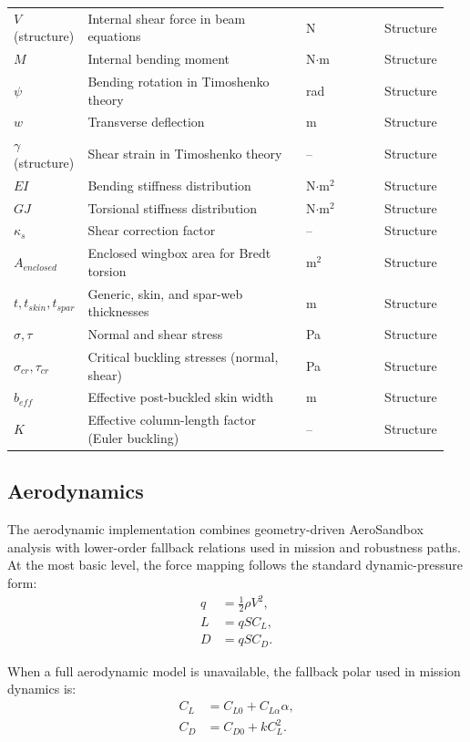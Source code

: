 \begin{longtable}{p{0.15\linewidth} p{0.50\linewidth} p{0.18\linewidth} p{0.12\linewidth}}
\(V\) (structure) & Internal shear force in beam equations & N & Structure \\
\(M\) & Internal bending moment & N\(\cdot\)m & Structure \\
\(\psi\) & Bending rotation in Timoshenko theory & rad & Structure \\
\(w\) & Transverse deflection & m & Structure \\
\(\gamma\) (structure) & Shear strain in Timoshenko theory & -- & Structure \\
\(EI\) & Bending stiffness distribution & N\(\cdot\)m\(^2\) & Structure \\
\(GJ\) & Torsional stiffness distribution & N\(\cdot\)m\(^2\) & Structure \\
\(\kappa_s\) & Shear correction factor & -- & Structure \\
\(A_{enclosed}\) & Enclosed wingbox area for Bredt torsion & m\(^2\) & Structure \\
\(t, t_{skin}, t_{spar}\) & Generic, skin, and spar-web thicknesses & m & Structure \\
\(\sigma, \tau\) & Normal and shear stress & Pa & Structure \\
\(\sigma_{cr}, \tau_{cr}\) & Critical buckling stresses (normal, shear) & Pa & Structure \\
\(b_{eff}\) & Effective post-buckled skin width & m & Structure \\
\(K\) & Effective column-length factor (Euler buckling) & -- & Structure \\
\bottomrule
\end{longtable}

\subsection{Aerodynamics}
The aerodynamic implementation combines geometry-driven AeroSandbox analysis with lower-order fallback relations used in mission and robustness paths. At the most basic level, the force mapping follows the standard dynamic-pressure form:
\begin{align}
q &= \tfrac{1}{2}\rho V^2, \\
L &= q S C_L, \\
D &= q S C_D.
\end{align}

When a full aerodynamic model is unavailable, the fallback polar used in mission dynamics is:
\begin{align}
C_L &= C_{L0} + C_{L\alpha}\alpha, \\
C_D &= C_{D0} + k C_L^2.
\end{align}

